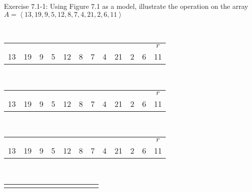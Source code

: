 \documentclass[addpoints,11pt]{exam}
\begin{document}
	
	\begin{questions}
		\question[5]
		Exercise 7.1-1: Using Figure 7.1 as a model, illustrate the operation  on the array $A = \left< 13, 19, 9, 5, 12, 8, 7, 4, 21, 2, 6, 11\right>$
		\begin{solutionorbox}
			\\
			\begin{tabular}{|c|c|c|c|c|c|c|c|c|c|c|c|}
				\multicolumn{1}{c}{}&
				\multicolumn{1}{c}{}&
				\multicolumn{1}{c}{}&
				\multicolumn{1}{c}{}&
				\multicolumn{1}{c}{}&
				\multicolumn{1}{c}{}&
				\multicolumn{1}{c}{}&
				\multicolumn{1}{c}{}&
				\multicolumn{1}{c}{}&
				\multicolumn{1}{c}{}&
				\multicolumn{1}{c}{}&
				\multicolumn{1}{c}{$r$}\\
				13&
				19&
				9&
				5&
				12&
				8&
				7&
				4&
				21&
				2&
				6&
				11
			\end{tabular}\\
			\begin{tabular}{|c|c|c|c|c|c|c|c|c|c|c|c|}
				\multicolumn{1}{c}{}&
				\multicolumn{1}{c}{}&
				\multicolumn{1}{c}{}&
				\multicolumn{1}{c}{}&
				\multicolumn{1}{c}{}&
				\multicolumn{1}{c}{}&
				\multicolumn{1}{c}{}&
				\multicolumn{1}{c}{}&
				\multicolumn{1}{c}{}&
				\multicolumn{1}{c}{}&
				\multicolumn{1}{c}{}&
				\multicolumn{1}{c}{$r$}\\
				\cellcolor{lightred}13&
				19&
				9&
				5&
				12&
				8&
				7&
				4&
				21&
				2&
				6&
				11
			\end{tabular}\\
			\begin{tabular}{|c|c|c|c|c|c|c|c|c|c|c|c|}
				\multicolumn{1}{c}{}&
				\multicolumn{1}{c}{}&
				\multicolumn{1}{c}{}&
				\multicolumn{1}{c}{}&
				\multicolumn{1}{c}{}&
				\multicolumn{1}{c}{}&
				\multicolumn{1}{c}{}&
				\multicolumn{1}{c}{}&
				\multicolumn{1}{c}{}&
				\multicolumn{1}{c}{}&
				\multicolumn{1}{c}{}&
				\multicolumn{1}{c}{$r$}\\
				\cellcolor{lightred}13&
				\cellcolor{lightred}19&
				9&
				5&
				12&
				8&
				7&
				4&
				21&
				2&
				6&
				11
			\end{tabular}\\
			\begin{tabular}{|c|c|c|c|c|c|c|c|c|c|c|c|}
				\multicolumn{1}{c}{}&
				\multicolumn{1}{c}{}&
				\multicolumn{1}{c}{}&

\end{tabular}
\end{solutionorbox}
\end{questions}
\end{document}
